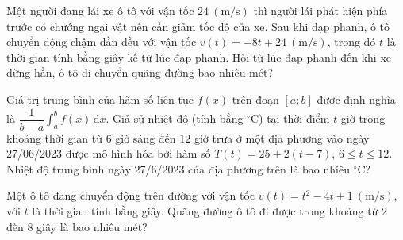 \begin{bt}%
	Một người đang lái xe ô tô với vận tốc $24~(\text{m/s})$ thì người lái phát hiện phía trước có chướng ngại vật nên cần giảm tốc độ của xe. Sau khi đạp phanh, ô  tô chuyển động chậm dần đều với vận tốc $v(t)=-8t+24~(\text{m/s})$, trong đó $t$ là thời gian tính bằng giây kế từ lúc đạp phanh. Hỏi từ lúc đạp phanh đến khi xe dừng hẳn, ô tô di chuyển quãng đường bao nhiêu mét?
\end{bt}

\begin{bt}%
	Giá trị trung bình của hàm số liên tục $f(x)$ trên đoạn $[a;b]$ được định nghĩa là $\dfrac{1}{b-a}\displaystyle\int_a^b f(x)\mathrm{\,d}x$. Giả sử nhiệt độ (tính bằng $^\circ$C) tại thời điểm $t$ giờ trong khoảng thời gian từ $6$ giờ sáng đến $12$ giờ trưa ở một địa phương vào ngày 27/06/2023 được mô hình hóa bởi hàm số $T(t)=25+2(t-7),\,6\le  t\le 12$. Nhiệt độ trung bình ngày 27/6/2023 của địa phương trên là bao nhiêu $^\circ$C?
\end{bt}

\begin{bt}%
	Một ô tô  đang chuyển động trên đường với vận tốc $v(t)=t^2-4t+1~\left(\text{m/s}\right)$, với $t$ là thời gian tính bằng giây. Quãng đường ô tô đi được trong khoảng từ $2$ đến $8$ giây là bao nhiêu mét?
\end{bt}


